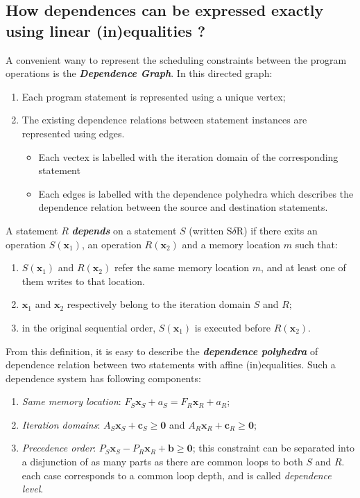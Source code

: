 \subsection{How dependences can be expressed exactly using linear (in)equalities ?}

A convenient wany to represent the scheduling constraints between the program
operations is the \textbf{\textit{Dependence Graph}}. In this directed graph:
\begin{enumerate}
  \item {\color{red} Each} program statement is represented using a
  unique vertex;
  \item The existing dependence relations between statement instances are represented
  using edges.
  \begin{itemize}
    \item {\color{red} Each vectex is labelled with the iteration domain} of the
    corresponding statement
    \item {\color{red} Each edges is labelled with the dependence polyhedra} which
    describes the dependence relation between the source and destination statements.
  \end{itemize}
\end{enumerate}

A statement $R$ \textbf{\emph{depends}} on a statement $S$ (written S$\delta$R)
if there exits an operation $S(\bm{x}_1)$, an operation $R(\bm{x}_2)$ and a memory
location $m$ such that:
\begin{enumerate}
\item $S(\bm{x}_1)$ and $R(\bm{x}_2)$ refer the same memory location $m$,
and at least one of them writes to that location.
\item $\bm{x}_1$ and $\bm{x}_2$ respectively belong to the iteration domain $S$ and $R$;
\item in the original sequential order, $S(\bm{x}_1)$ is executed before $R(\bm{x}_2)$.
\end{enumerate}

From this definition, it is easy to describe the \textbf{\emph{dependence polyhedra}} of
{\color{red}{each}} dependence relation between two statements with affine
(in)equalities. Such a dependence system has following components:

\begin{enumerate}
  \item \emph{Same memory location}: $F_S\bm{x}_S + a_S = F_R\bm{x}_R + a_R$;
  \item \emph{Iteration domains}: $A_S\bm{x}_S+\bm{c}_S\ge \bm{0}$ and  $A_R\bm{x}_R+\bm{c}_R \ge \bm{0}$;
  \item \emph{Precedence order}: $P_S\bm{x}_S - P_R\bm{x}_R + \bm{b} \ge \bm{0}$;
  \iitem this constraint can be separated into a disjunction of as many parts as there are common loops to both $S$ and $R$.
  \iitem each case corresponds to a common loop depth, and is called \emph{dependence level}.
\end{enumerate}

